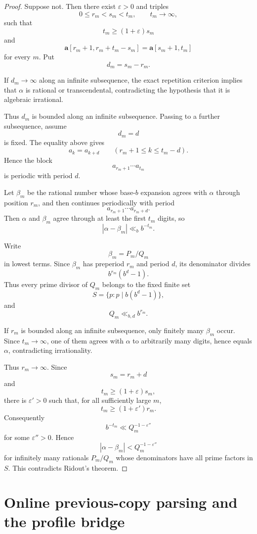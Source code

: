 \documentclass[11pt]{amsart}
\begin{document}
\begin{proof}
Suppose not. Then there exist \(\varepsilon>0\) and triples
\[
0\leq r_m<s_m<t_m,
\qquad
t_m\to\infty,
\]
such that
\[
t_m\geq (1+\varepsilon)s_m
\]
and
\[
\mathbf a[r_m+1,r_m+t_m-s_m]
=
\mathbf a[s_m+1,t_m]
\]
for every \(m\). Put
\[
d_m=s_m-r_m.
\]

If \(d_m\to\infty\) along an infinite subsequence, the exact repetition criterion implies that \(\alpha\) is rational or transcendental, contradicting the hypothesis that it is algebraic irrational.

Thus \(d_m\) is bounded along an infinite subsequence. Passing to a further subsequence, assume
\[
d_m=d
\]
is fixed. The equality above gives
\[
a_k=a_{k+d}
\qquad
(r_m+1\leq k\leq t_m-d).
\]
Hence the block
\[
a_{r_m+1}\cdots a_{t_m}
\]
is periodic with period \(d\).

Let \(\beta_m\) be the rational number whose base-\(b\) expansion agrees with \(\alpha\) through position \(r_m\), and then continues periodically with period
\[
a_{r_m+1}\cdots a_{r_m+d}.
\]
Then \(\alpha\) and \(\beta_m\) agree through at least the first \(t_m\) digits, so
\[
|\alpha-\beta_m|\ll_b b^{-t_m}.
\]

Write
\[
\beta_m=P_m/Q_m
\]
in lowest terms. Since \(\beta_m\) has preperiod \(r_m\) and period \(d\), its denominator divides
\[
b^{r_m}(b^d-1).
\]
Thus every prime divisor of \(Q_m\) belongs to the fixed finite set
\[
S=\{p:p\mid b(b^d-1)\},
\]
and
\[
Q_m\ll_{b,d} b^{r_m}.
\]

If \(r_m\) is bounded along an infinite subsequence, only finitely many \(\beta_m\) occur. Since \(t_m\to\infty\), one of them agrees with \(\alpha\) to arbitrarily many digits, hence equals \(\alpha\), contradicting irrationality.

Thus \(r_m\to\infty\). Since
\[
s_m=r_m+d
\]
and
\[
t_m\geq(1+\varepsilon)s_m,
\]
there is \(\varepsilon'>0\) such that, for all sufficiently large \(m\),
\[
t_m\geq(1+\varepsilon')r_m.
\]
Consequently
\[
b^{-t_m}\ll Q_m^{-1-\varepsilon''}
\]
for some \(\varepsilon''>0\). Hence
\[
|\alpha-\beta_m|<Q_m^{-1-\varepsilon''}
\]
for infinitely many rationals \(P_m/Q_m\) whose denominators have all prime factors in \(S\). This contradicts Ridout's theorem.
\end{proof}

\section{Online previous-copy parsing and the profile bridge}
\end{document}
